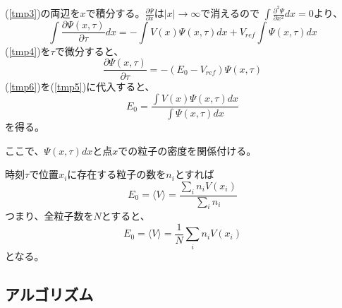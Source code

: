 \documentclass[dvipdfmx]{beamer}
\begin{document}
    \begin{frame}
      (\ref{tmp3})の両辺を$x$で積分する。$\frac{\partial\Psi}{\partial x}$は$|x|\to\infty$で消えるので
      $\int \frac{\partial^2\Psi}{\partial x^2} dx = 0$より、
      \begin{equation}
        \label{tmp5}
        \int \frac{\partial\Psi(x,\tau)}{\partial \tau} dx = -\int V(x)\Psi(x,\tau)dx + V_{ref}\int \Psi(x,\tau)dx
      \end{equation}
      (\ref{tmp4})を$\tau$で微分すると、
      \begin{equation}
        \label{tmp6}
        \dfrac{\partial \Psi(x,\tau)}{\partial \tau} = -(E_0 - V_{ref})\Psi(x,\tau)
      \end{equation}
      (\ref{tmp6})を(\ref{tmp5})に代入すると、
      \begin{equation}
        E_0 = \dfrac{\int V(x) \Psi(x,\tau) dx}{\int \Psi(x,\tau) dx}
      \end{equation}
      を得る。
    \end{frame}
    \begin{frame}
      ここで、$\Psi(x,\tau)dx$と点$x$での粒子の密度を関係付ける。

      時刻$\tau$で位置$x_i$に存在する粒子の数を$n_i$とすれば
      \begin{equation}
        E_0 = \langle V \rangle =  \dfrac{\sum_{i} n_i V(x_i)}{\sum_{i} n_i}
      \end{equation}
      つまり、全粒子数を$N$とすると、
      \begin{equation}
          E_0 = \langle V \rangle = \frac{1}{N}\sum_{i} n_i V(x_i)
      \end{equation}
      となる。

    \end{frame}


    \subsection{アルゴリズム}
\end{document}
